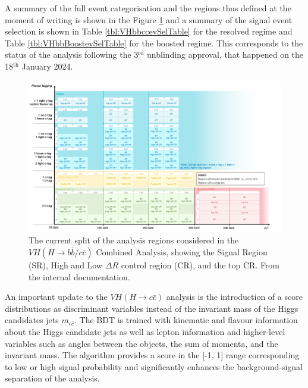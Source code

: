 A summary of the full event categorisation and the regions thus defined at the moment of writing is shown in the Figure \ref{fig:ana-strat-det} and a summary of the signal event selection is shown in Table \ref{tbl:VHbbccevSelTable} for the resolved regime and Table \ref{tbl:VHbbBoostevSelTable} for the boosted regime. This corresponds to the status of the analysis following the 3$^{\textrm{rd}}$ unblinding approval, that happened on the 18$^{\textrm{th}}$ January 2024. 

\clearpage

\begin{figure}
    \centering
    \includegraphics[width=\textwidth]{Images/VH/Cat/VH_analysis_cat.pdf}
    \caption{The current split of the analysis regions considered in the $VH (H\rightarrow b\bar{b}/c\bar{c})$ Combined Analysis, showing the Signal Region (SR), High and Low $\Delta R$ control region (CR), and the top CR. From the internal documentation.} 
    \label{fig:ana-strat-det}
\end{figure}


An important update to the $VH (H\rightarrow c\bar{c})$ analysis is the introduction of a  score distributions as discriminant variables instead of the invariant mass of the Higgs candidates jets $m_{c\bar{c}}$. The BDT is trained with kinematic and flavour information about the Higgs candidate jets as well as lepton information and higher-level variables such as angles between the objects, the sum of momenta, and the invariant mass. The algorithm provides a score in the [-1, 1] range corresponding to low or high signal probability and significantly enhances the background-signal separation of the analysis.


